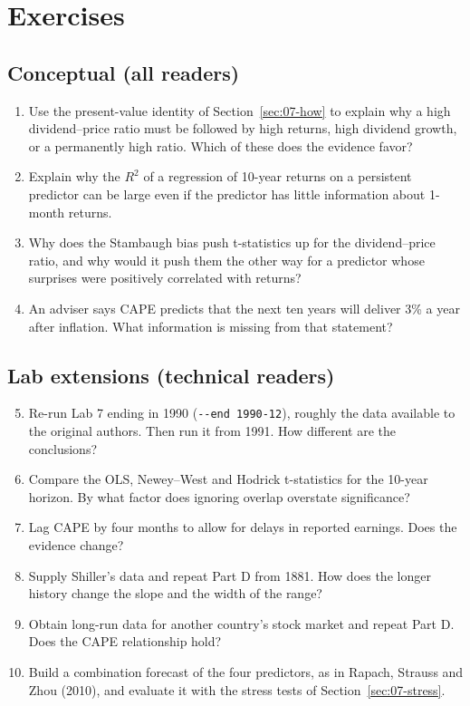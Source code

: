 \section*{Exercises}

\subsection*{Conceptual (all readers)}

\begin{enumerate}
  \item Use the present-value identity of Section~\ref{sec:07-how} to explain why a high dividend--price ratio must be followed by high returns, high dividend growth, or a permanently high ratio. Which of these does the evidence favor?
  \item Explain why the $R^2$ of a regression of 10-year returns on a persistent predictor can be large even if the predictor has little information about 1-month returns.
  \item Why does the Stambaugh bias push t-statistics up for the dividend--price ratio, and why would it push them the other way for a predictor whose surprises were positively correlated with returns?
  \item An adviser says CAPE predicts that the next ten years will deliver 3\% a year after inflation. What information is missing from that statement?
\end{enumerate}

\subsection*{Lab extensions (technical readers)}

\begin{enumerate}
  \setcounter{enumi}{4}
  \item Re-run Lab 7 ending in 1990 (\texttt{-{}-end 1990-12}), roughly the data available to the original authors. Then run it from 1991. How different are the conclusions?
  \item Compare the OLS, Newey--West and Hodrick t-statistics for the 10-year horizon. By what factor does ignoring overlap overstate significance?
  \item Lag CAPE by four months to allow for delays in reported earnings. Does the evidence change?
  \item Supply Shiller's data and repeat Part D from 1881. How does the longer history change the slope and the width of the range?
  \item Obtain long-run data for another country's stock market and repeat Part D. Does the CAPE relationship hold?
  \item Build a combination forecast of the four predictors, as in Rapach, Strauss and Zhou (2010), and evaluate it with the stress tests of Section~\ref{sec:07-stress}.
\end{enumerate}

